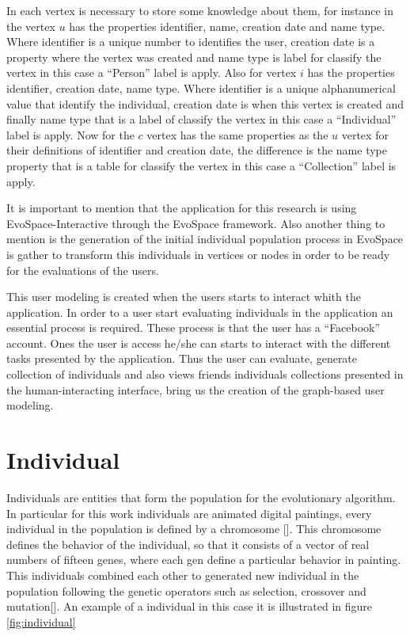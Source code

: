 In each vertex is necessary to store some knowledge about them, for instance in
the vertex $u$ has the properties identifier, name, creation date and name type.
Where identifier is a unique number to identifies the user, creation date is a
property where the vertex was created and name type is label for classify the
vertex in this case a “Person” label is apply. Also for vertex $i$ has the
properties identifier,  creation date, name type. Where identifier is a unique
alphanumerical value  that identify the individual, creation date is when this
vertex is created and finally name type that is a label of classify the vertex
in this case a “Individual” label is apply. Now for the  $c$ vertex has the same
properties as the $u$ vertex for their definitions of identifier and creation
date, the difference is the name type property that is a table for classify the
vertex in this case a “Collection” label is apply.

It is important to mention that the application for this research is using
EvoSpace-Interactive through the EvoSpace framework. Also another thing to
mention  is the generation of the initial individual population process in
EvoSpace is gather to transform this individuals in vertices or nodes in order
to  be ready for the evaluations of the users.
 
This user modeling is created when the users starts to interact whith the
application. In order to a user start evaluating individuals  in the application
an essential process is required. These process is that the user has a
“Facebook” account. Ones the user is access he/she can starts to interact with
the different tasks presented by the application. Thus the user can evaluate,
generate collection of individuals and also views friends individuals
collections presented in the human-interacting interface, bring us the creation
of the graph-based user modeling.


\section{Individual}  

Individuals are entities that form the population for the evolutionary
algorithm. In particular for  this work individuals are animated digital
paintings, every individual in the population is defined by a chromosome [].
This chromosome defines the behavior of the individual, so that it consists of a
vector of real numbers of fifteen genes, where each gen define a particular
behavior in painting. This individuals combined each other to generated new
individual in the population following the genetic operators such as selection,
crossover and mutation[]. An example of a individual in this case it is
illustrated in figure \ref{fig:individual}


